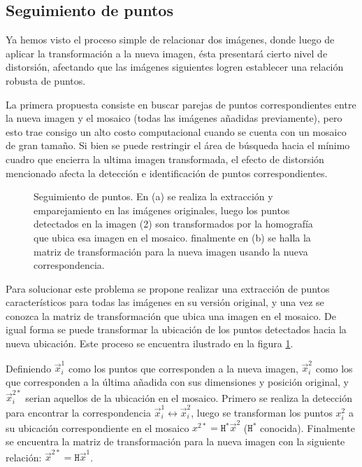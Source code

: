 \subsection{Seguimiento de puntos}\label{seguimiento-puntos}

Ya hemos visto el proceso simple de relacionar dos imágenes, donde luego de aplicar la transformación a la nueva imagen, ésta presentará cierto nivel de distorsión, afectando que las imágenes siguientes logren establecer una relación robusta de puntos.

La primera propuesta consiste en buscar parejas de puntos correspondientes entre la nueva imagen y el mosaico (todas las imágenes añadidas previamente), pero esto trae consigo un alto costo computacional cuando se cuenta con un mosaico de gran tamaño. Si bien se puede restringir el área de búsqueda hacia el mínimo cuadro que encierra la ultima imagen transformada, el efecto de distorsión mencionado afecta la detección e identificación de puntos correspondientes.

\begin{figure}[h]
	\centering     %
	
	
	\caption[Seguimiento de puntos]{Seguimiento de puntos. En (a) se realiza la extracción y emparejamiento en las imágenes originales, luego los puntos detectados en la imagen (2) son transformados por la homografía que ubica esa imagen en el mosaico. finalmente en (b) se halla la matriz de transformación para la nueva imagen usando la nueva correspondencia.}
	\label{imagen:track}
\end{figure}

Para solucionar este problema se propone realizar una extracción de puntos característicos para todas las imágenes en su versión original, y una vez se conozca la matriz de transformación que ubica una imagen en el mosaico. De igual forma se puede transformar la ubicación de los puntos detectados hacia la nueva ubicación. Este proceso se encuentra ilustrado en la figura \ref{imagen:track}.

Definiendo $\vec{x}^1_i$ como los puntos que corresponden a la nueva imagen, $\vec{x}^2_i$ como los que corresponden a la última añadida con sus dimensiones y posición original, y $\vec{x}^{2*}_i$ serian aquellos de la ubicación en el mosaico. Primero se realiza la detección para encontrar la correspondencia $\vec{x}^1_i \leftrightarrow \vec{x}^2_i$, luego se transforman los puntos $x^2_i$ a su ubicación correspondiente en el mosaico $x^{2*} = \mathtt{H}^*\vec{x}^2$ ($\mathtt{H}^*$ conocida). Finalmente se encuentra la matriz de transformación para la nueva imagen con la siguiente relación: $\vec{x}^{2*} = \mathtt{H}\vec{x}^1$.



